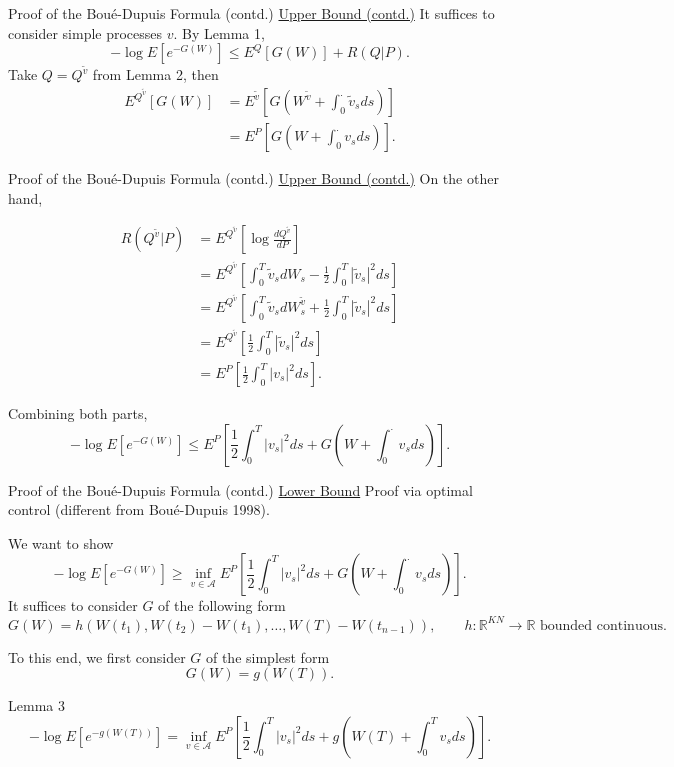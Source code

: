 \documentclass{if-beamer}
\begin{document}
\begin{frame}{Proof of the Boué-Dupuis Formula (contd.)}
    \underline{Upper Bound (contd.)} It suffices to consider simple processes $v$. By Lemma 1,
    \[
        -\log E\left[e^{-G(W)}\right] \leq E^{Q}[G(W)] + R(Q|P).
    \]
    Take $Q = Q^{\tilde v}$ from Lemma 2, then
    \begin{align*}
        E^{Q^{\tilde v}}[G(W)] &= E^{\tilde v}[G(W^{\tilde v} + \int_0^{\cdot} \tilde v_s ds)]\\
        &= E^P [G(W + \int_0^{\cdot} v_s ds)].
    \end{align*}

\end{frame}


\begin{frame}{Proof of the Boué-Dupuis Formula (contd.)}
    \underline{Upper Bound (contd.)} On the other hand,

    \begin{align*}
        R(Q^{\tilde v}|P) &= E^{Q^{\tilde v}}\left[ \log \frac{d Q^{\tilde v}}{d P} \right] \\
        &= E^{Q^{\tilde v}}\left[ \int_0^T \tilde v_s dW_s - \frac{1}{2} \int_0^T |\tilde v_s|^2 ds \right] \\
        &= E^{Q^{\tilde v}}\left[ \int_0^T \tilde v_s dW^{\tilde v}_s + \frac{1}{2} \int_0^T |\tilde v_s|^2 ds \right] \\
        &= E^{Q^{\tilde v}}\left[ \frac{1}{2} \int_0^T |\tilde v_s|^2 ds \right] \\
        &= E^P\left[ \frac{1}{2} \int_0^T |v_s|^2 ds \right].
    \end{align*}

    Combining both parts,
    \[
        -\log E\left[e^{-G(W)}\right] \leq E^P\left[ \frac{1}{2} \int_0^T |v_s|^2 ds + G\left( W + \int_0^{\cdot} v_s ds \right) \right].
    \]

\end{frame}

\begin{frame}{Proof of the Boué-Dupuis Formula (contd.)}
    \underline{Lower Bound} Proof via optimal control (different from Boué-Dupuis 1998).

    We want to show
    \[
        -\log E\left[e^{-G(W)}\right] \geq \inf_{v \in \mathcal{A}} E^P\left[ \frac{1}{2} \int_0^T |v_s|^2 ds + G\left( W + \int_0^{\cdot} v_s ds \right) \right].
    \]
    It suffices to consider $G$ of the following form
    \[
        G(W) = h(W(t_1), W(t_2) - W(t_1), \dots, W(T) - W(t_{n-1})), \qquad h: \mathbb{R}^{K N} \to \mathbb{R} \text{ bounded continuous}.
    \]

    To this end, we first consider $G$ of the simplest form
    \[
        G(W) = g(W(T)).
    \]

    \begin{block}{Lemma 3}
        \[
            -\log E\left[e^{-g(W(T))}\right] = \inf_{v \in \mathcal{A}} E^P\left[ \frac{1}{2} \int_0^T |v_s|^2 ds + g\left( W(T) + \int_0^{T} v_s ds \right) \right].
        \]
    \end{block}
\end{frame}
\end{document}
